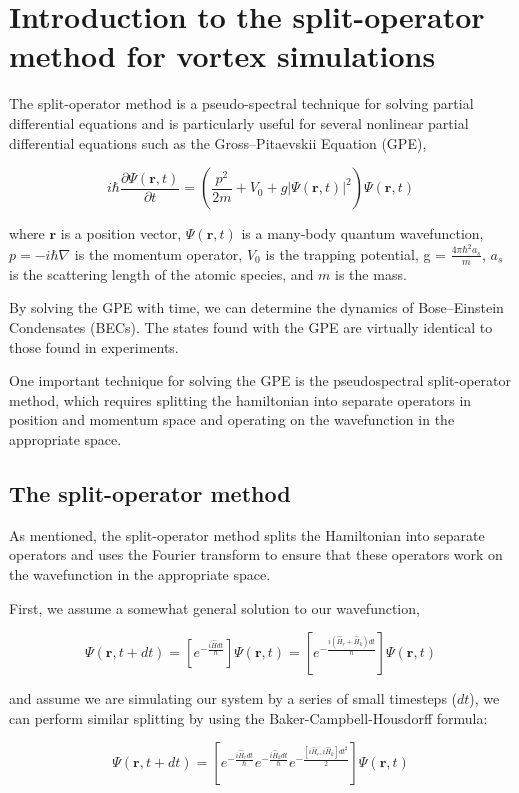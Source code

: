 \chapter{Introduction to the split-operator method for vortex simulations}
\label{ch:splitop}

The split-operator method is a pseudo-spectral technique for solving partial differential equations and is particularly useful for several nonlinear partial differential equations such as the Gross--Pitaevskii Equation (GPE),

$$
i \hbar \frac{\partial \Psi(\mathbf{r},t)}{\partial t} = \left(\frac{p^2}{2m} + V_0 + g |\Psi(\mathbf{r},t)|^2 \right)\Psi(\mathbf{r},t)
$$

where $\mathbf{r}$ is a position vector, $\Psi(\mathbf{r},t)$ is a many-body quantum wavefunction, $p = -i\hbar\nabla$ is the momentum operator, $V_0$ is the trapping potential, g = $\frac{4\pi\hbar^2 a_s}{m}$, $a_s$ is the scattering length of the atomic species, and $m$ is the mass.

By solving the GPE with time, we can determine the dynamics of Bose--Einstein Condensates (BECs).
The states found with the GPE are virtually identical to those found in experiments.

One important technique for solving the GPE is the pseudospectral split-operator method, which requires splitting the hamiltonian into separate operators in position and momentum space and operating on the wavefunction in the appropriate space.

\section{The split-operator method}

As mentioned, the split-operator method splits the Hamiltonian into separate operators and uses the Fourier transform to ensure that these operators work on the wavefunction in the appropriate space.

First, we assume a somewhat general solution to our wavefunction,

$$
\Psi(\mathbf{r},t + dt) = \left[e^{-\frac{i\hat{H}dt}{\hbar}}\right]\Psi(\mathbf{r},t) = \left[e^{-\frac{i(\hat{H}_r + \hat{H}_k)dt}{\hbar}}\right]\Psi(\mathbf{r},t)
$$

and assume we are simulating our system by a series of small timesteps ($dt$), we can perform similar splitting by using the Baker-Campbell-Housdorff formula:

$$
\Psi(\mathbf{r},t+dt) = \left[e^{-\frac{i\hat{H}_rdt}{\hbar}}e^{-\frac{i\hat{H}_kdt}{\hbar}}e^{-\frac{[i\hat{H}_r, i\hat{H}_k]dt^2}{2}}\right]\Psi(\mathbf{r},t)
$$

